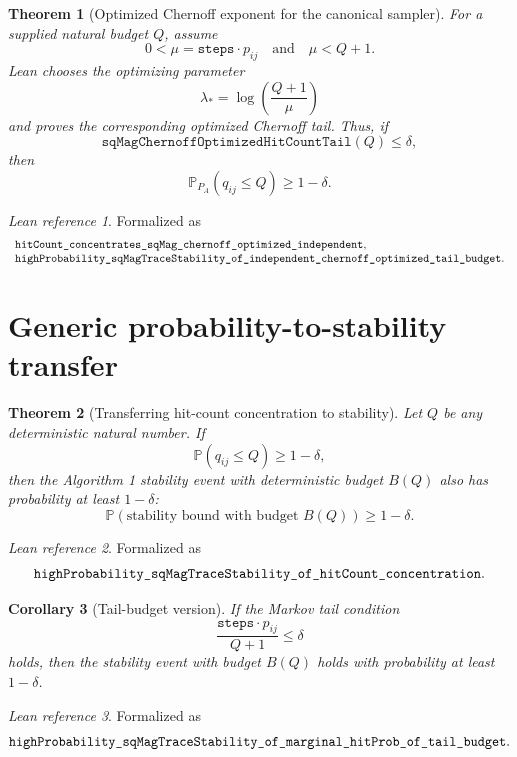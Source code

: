 \documentclass[11pt]{article}
\newcommand{\Prob}{\mathbb{P}}
\newcommand{\lean}[1]{\texttt{\detokenize{#1}}}
\newtheorem{theorem}{Theorem}
\newtheorem{corollary}[theorem]{Corollary}
\theoremstyle{definition}
\theoremstyle{remark}
\newtheorem*{leanref}{Lean reference}
\begin{document}
\begin{theorem}[Optimized Chernoff exponent for the canonical sampler]
For a supplied natural budget \(Q\), assume
\[
  0 < \mu = \texttt{steps}\cdot p_{ij}
  \quad\text{and}\quad
  \mu < Q+1.
\]
Lean chooses the optimizing parameter
\[
  \lambda_* = \log\left(\frac{Q+1}{\mu}\right)
\]
and proves the corresponding optimized Chernoff tail. Thus, if
\[
  \texttt{sqMagChernoffOptimizedHitCountTail}(Q) \le \delta,
\]
then
\[
  \Prob_{P_A}(q_{ij}\le Q) \ge 1-\delta.
\]
\end{theorem}

\begin{leanref}
Formalized as
\[
\begin{array}{l}
  \lean{hitCount_concentrates_sqMag_chernoff_optimized_independent},\\
  \lean{highProbability_sqMagTraceStability_of_independent_chernoff_optimized_tail_budget}.
\end{array}
\]
\end{leanref}

\section*{Generic probability-to-stability transfer}

\begin{theorem}[Transferring hit-count concentration to stability]
Let \(Q\) be any deterministic natural number. If
\[
  \Prob(q_{ij} \le Q) \ge 1-\delta,
\]
then the Algorithm 1 stability event with deterministic budget \(B(Q)\) also
has probability at least \(1-\delta\):
\[
  \Prob(\text{stability bound with budget }B(Q)) \ge 1-\delta.
\]
\end{theorem}

\begin{leanref}
Formalized as
\[
  \lean{highProbability_sqMagTraceStability_of_hitCount_concentration}.
\]
\end{leanref}

\begin{corollary}[Tail-budget version]
If the Markov tail condition
\[
  \frac{\texttt{steps}\cdot p_{ij}}{Q+1} \le \delta
\]
holds, then the stability event with budget \(B(Q)\) holds with probability at
least \(1-\delta\).
\end{corollary}

\begin{leanref}
Formalized as
\[
  \lean{highProbability_sqMagTraceStability_of_marginal_hitProb_of_tail_budget}.
\]
\end{leanref}
\end{document}

